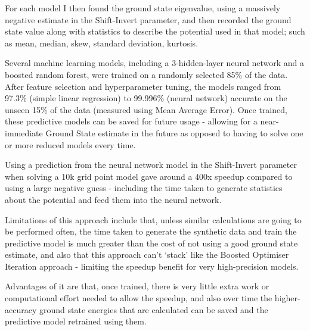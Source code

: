 For each model I then found the ground state eigenvalue, using a massively negative estimate in the Shift-Invert parameter, and then recorded the ground state value along with statistics to describe the potential used in that model; such as mean, median, skew, standard deviation, kurtosis. 

Several machine learning models\cite{sklearn}, including a 3-hidden-layer neural network and a boosted random forest, were trained on a randomly selected 85\% of the data. After feature selection and hyperparameter tuning, the models ranged from 97.3\% (simple linear regression) to 99.996\% (neural network) accurate on the unseen 15\% of the data (measured using Mean Average Error).
Once trained, these predictive models can be saved for future usage - allowing for a near-immediate Ground State estimate in the future as opposed to having to solve one or more reduced models every time. 

Using a prediction from the neural network model in the Shift-Invert parameter when solving a 10k grid point model gave around a 400x speedup compared to using a large negative guess - including the time taken to generate statistics about the potential and feed them into the neural network. 

Limitations of this approach include that, unless similar calculations are going to be performed often, the time taken to generate the synthetic data and train the predictive model is much greater than the cost of not using a good ground state estimate, and also that this approach can't `stack' like the Boosted Optimiser Iteration approach - limiting the speedup benefit for very high-precision models. 

Advantages of it are that, once trained, there is very little extra work or computational effort needed to allow the speedup, and also over time the higher-accuracy ground state energies that are calculated can be saved and the predictive model retrained using them.


